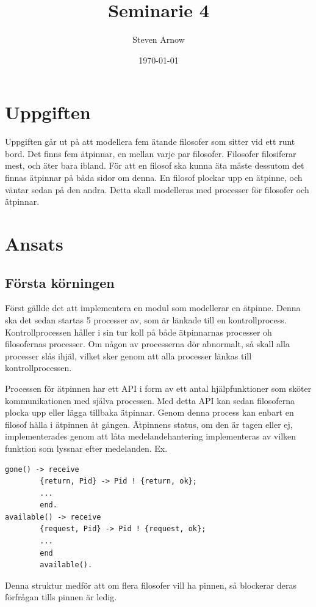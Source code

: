 \documentclass[a4paper, 11pt]{article}
\title{Seminarie 4}
\author{Steven Arnow}
\date{\today}
\begin{document}
\maketitle

\section{Uppgiften}

Uppgiften går ut på att modellera fem ätande filosofer som sitter vid ett runt bord. Det finns fem ätpinnar, en mellan varje par filosofer. Filosofer filosiferar mest, och äter bara ibland.  För att en filosof ska kunna äta måste dessutom det finnas ätpinnar på båda sidor om denna. En filosof plockar upp en ätpinne, och väntar sedan på den andra. Detta skall modelleras med processer för filosofer och ätpinnar.

\section{Ansats}
\subsection{Första körningen}

Först gällde det att implementera en modul som modellerar en ätpinne. Denna ska det sedan startas 5 processer av, som är länkade till en kontrollprocess. Kontrollprocessen håller i sin tur koll på både ätpinnarnas processer oh filosofernas processer. Om någon av processerna dör abnormalt, så skall alla processer slås ihjäl, vilket sker genom att alla processer länkas till kontrollprocessen.

Processen för ätpinnen har ett API i form av ett antal hjälpfunktioner som sköter kommunikationen med själva processen. Med detta API kan sedan filosoferna plocka upp eller lägga tillbaka ätpinnar. Genom denna process kan enbart en filosof hålla i ätpinnen åt gången. Ätpinnens status, om den är tagen eller ej, implementerades genom att låta medelandehantering implementeras av vilken funktion som lyssnar efter medelanden. Ex.
\begin{verbatim}
gone() -> receive
        {return, Pid} -> Pid ! {return, ok};
        ...
        end.
available() -> receive
        {request, Pid} -> Pid ! {request, ok};
        ...
        end
        available().
\end{verbatim}

Denna struktur medför att om flera filosofer vill ha pinnen, så blockerar deras förfrågan tills pinnen är ledig.
\end{document}
